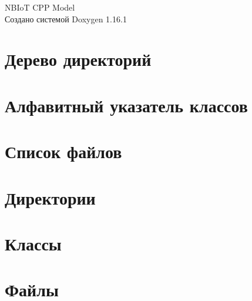 \documentclass[twoside]{book}
\newcommand{\+}{\discretionary{\mbox{\scriptsize$\hookleftarrow$}}{}{}}
\newcommand{\clearemptydoublepage}{%
    \newpage{\pagestyle{empty}\cleardoublepage}%
  }
\begin{document}
  \raggedbottom
    \hypersetup{pageanchor=false,
                bookmarksnumbered=true,
                pdfencoding=unicode
               }
  \begin{titlepage}
  \vspace*{7cm}
  \begin{center}%
  {\Large NBIo\+T CPP Model}\\
  \vspace*{1cm}
  {\large Создано системой Doxygen 1.16.1}\\
  \end{center}
  \end{titlepage}
  \clearemptydoublepage
  \tableofcontents
  \clearemptydoublepage
  \hypersetup{pageanchor=true}
\chapter{Дерево директорий}

\chapter{Алфавитный указатель классов}

\chapter{Список файлов}

\chapter{Директории}




\chapter{Классы}

\chapter{Файлы}




  \backmatter
  \newpage
  \clearemptydoublepage
  \printindex
\end{document}
